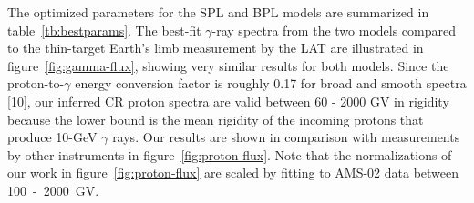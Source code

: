 The optimized parameters  for the SPL and BPL models are summarized in table~\ref{tb:bestparams}. 
The best-fit $\gamma$-ray spectra from the two models
compared to the thin-target Earth's limb measurement by the LAT are illustrated
in figure~\ref{fig:gamma-flux}, showing very similar results for both models.
Since the proton-to-$\gamma$ energy conversion factor is roughly 0.17 for broad
and smooth spectra [10], our inferred CR proton spectra are valid between 60 - 2000 GV
in rigidity
because the lower bound is the mean rigidity of the incoming protons that produce 10-GeV $\gamma$ rays.
Our results are shown in comparison with measurements by other instruments in figure~\ref{fig:proton-flux}.
Note that the normalizations of our work in figure~\ref{fig:proton-flux} are scaled
by fitting to AMS-02 data between 100~-~2000~GV.

